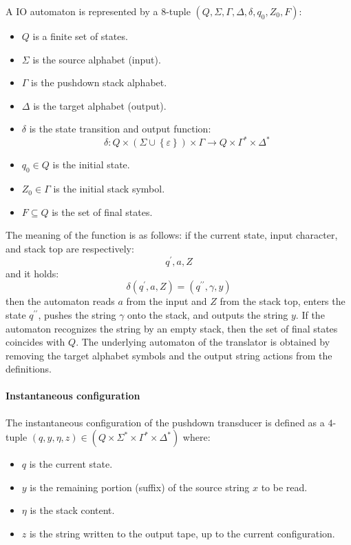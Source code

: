 A IO automaton is represented by a $8$-tuple $\left( Q, \Sigma, \Gamma, \Delta, \delta, q_0, Z_0, F \right)$:
\begin{itemize}
    \item $Q$ is a finite set of states.
    \item $\Sigma$ is the source alphabet (input). 
    \item $\Gamma$ is the pushdown stack alphabet. 
    \item $\Delta$ is the target alphabet (output). 
    \item $\delta$ is the state transition and output function: 
        \[\delta : Q \times \left( \Sigma \cup \left\{ \varepsilon \right\} \right) \times \Gamma \rightarrow Q \times \Gamma^{\ast} \times \Delta^{\ast}\]
    \item $q_0 \in Q$ is the initial state. 
    \item $Z_0 \in \Gamma$ is the initial stack symbol. 
    \item $F \subseteq Q$ is the set of final states. 
\end{itemize}
The meaning of the function is as follows: if the current state, input character, and stack top are respectively: 
\[ q^{\prime}, a, Z \]
and it holds: 
\[ \delta\left(q^{\prime}, a, Z\right) = \left( q^{\prime\prime}, \gamma, y \right) \]
then the automaton reads $a$ from the input and $Z$ from the stack top, enters the state $q^{\prime\prime}$, pushes the string $\gamma$ onto the stack, and outputs the string $y$.
If the automaton recognizes the string by an empty stack, then the set of final states coincides with $Q$.
The underlying automaton of the translator is obtained by removing the target alphabet symbols and the output string actions from the definitions.

\paragraph*{Instantaneous configuration}
The instantaneous configuration of the pushdown transducer is defined as a $4$-tuple $\left( q, y, \eta, z \right) \in \left( Q \times \Sigma^{\ast} \times \Gamma^{\ast} \times \Delta^{\ast} \right)$ where:
\begin{itemize}
    \item $q$ is the current state. 
    \item $y$ is the remaining portion (suffix) of the source string $x$ to be read. 
    \item $\eta$ is the stack content. 
    \item $z$ is the string written to the output tape, up to the current configuration. 
\end{itemize}

